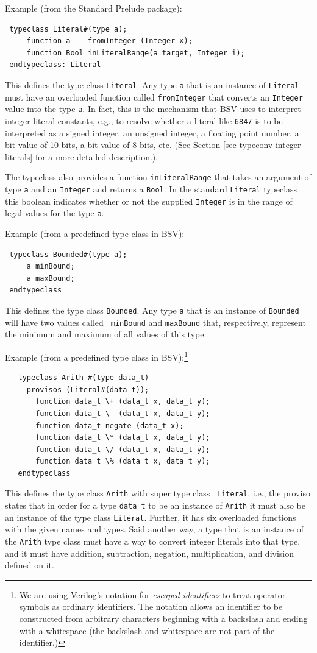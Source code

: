 \documentclass[twoside,letterpaper]{article}
\newcommand{\BSV}{BSV}
\newcommand{\V}{Verilog}
\begin{document}
Example (from the Standard Prelude package):
\begin{verbatim}
 typeclass Literal#(type a);
     function a    fromInteger (Integer x);
     function Bool inLiteralRange(a target, Integer i);
 endtypeclass: Literal
\end{verbatim}
This defines the type class \texttt{Literal}.  Any type \texttt{a} that is
an instance of \texttt{Literal} must have an overloaded function called
\texttt{fromInteger} that converts an \texttt{Integer} value into the type
\texttt{a}.  In fact, this is the mechanism that {\BSV} uses to interpret
integer literal constants, e.g., to resolve whether a literal like
\texttt{6847} is to be interpreted as a signed integer, an unsigned
integer, a floating point number, a bit value of 10 bits, a bit value
of 8 bits, etc.  (See Section \ref{sec-typeconv-integer-literals} for
a more detailed description.). 

The typeclass also provides a function \texttt{inLiteralRange} that takes
an argument of type \texttt{a} and an \texttt{Integer} and returns a 
\texttt{Bool}. In the standard \texttt{Literal} typeclass this boolean
indicates whether or not the supplied \texttt{Integer} is in the range
of legal values for the type \texttt{a}.
 
Example (from a predefined type class in {\BSV}):
\begin{verbatim}
 typeclass Bounded#(type a);
     a minBound;
     a maxBound;
 endtypeclass
\end{verbatim}
This defines the type class \texttt{Bounded}.  Any type \texttt{a} that is
an instance of \texttt{Bounded} will have two values called {\tt
minBound} and \texttt{maxBound} that, respectively, represent the minimum
and maximum of all values of this type.

Example (from a predefined type class in {\BSV}):\footnote{ We are
using {\V}'s notation for \emph{escaped identifiers} to treat operator
symbols as ordinary identifiers.  The notation allows an identifier to
be constructed from arbitrary characters beginning with a backslash
and ending with a whitespace (the backslash and whitespace are not
part of the identifier.)}
\begin{verbatim}
   typeclass Arith #(type data_t)
     provisos (Literal#(data_t));
       function data_t \+ (data_t x, data_t y);
       function data_t \- (data_t x, data_t y);
       function data_t negate (data_t x);
       function data_t \* (data_t x, data_t y);
       function data_t \/ (data_t x, data_t y);
       function data_t \% (data_t x, data_t y);
   endtypeclass
\end{verbatim}
This defines the type class \texttt{Arith} with super type class {\tt
Literal}, i.e., the proviso states that in order for a type \texttt{data\_t} to
be an instance of \texttt{Arith} it must also be an instance of the type
class \texttt{Literal}.  Further, it has six overloaded functions with
the given names and types.  Said another way, a type that is an
instance of the \texttt{Arith} type class must have a way to convert
integer literals into that type, and it must have addition,
subtraction, negation, multiplication, and division defined on it.
\end{document}
